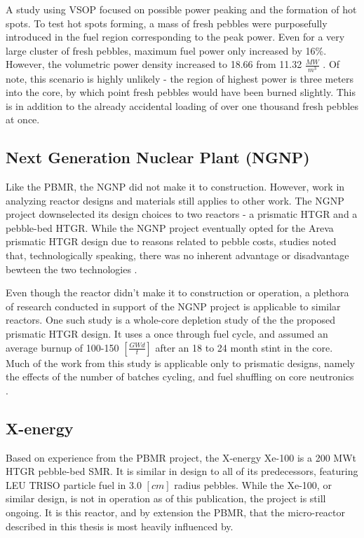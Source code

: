 A study using VSOP focused on possible power peaking and the formation of hot spots.  To test hot spots forming, a mass of fresh pebbles were purposefully introduced in the fuel region corresponding to the peak power.  Even for a very large cluster of fresh pebbles, maximum fuel power only increased by 16\%.  However, the volumetric power density increased to 18.66 from 11.32 $\frac{MW}{m^3}$ \cite{reitsma_investigation_2005}.  Of note, this scenario is highly unlikely - the region of highest power is three meters into the core, by which point fresh pebbles would have been burned slightly.  This is in addition to the already accidental loading of over one thousand fresh pebbles at once.

\subsection{Next Generation Nuclear Plant (NGNP)}

Like the PBMR, the NGNP did not make it to construction.  However, work in analyzing reactor designs and materials still applies to other work.  The NGNP project downselected its design choices to two reactors - a prismatic HTGR and a pebble-bed HTGR.  While the NGNP project eventually opted for the Areva prismatic HTGR design \cite{noauthor_areva_nodate} due to reasons related to pebble costs, studies noted that, technologically speaking, there was no inherent advantage or disadvantage bewteen the two technologies \cite{inl_basis_2011}.

Even though the reactor didn't make it to construction or operation, a plethora of research conducted in support of the NGNP project is applicable to similar reactors.  One such study is a whole-core depletion study of the the proposed prismatic HTGR design.  It uses a once through fuel cycle, and assumed an average burnup of 100-150 $\left[\frac{GWd}{t}\right]$ after an 18 to 24 month stint in the core.  Much of the work from this study is applicable only to prismatic designs, namely the effects of the number of batches cycling, and fuel shuffling on core neutronics \cite{tkkim_whole-core_nodate}.

\subsection{X-energy}

Based on experience from the PBMR project, the X-energy Xe-100 is a 200 MWt HTGR pebble-bed SMR.  It is similar in design to all of its predecessors, featuring LEU TRISO particle fuel in 3.0 $\left[cm\right]$ radius pebbles.  While the Xe-100, or similar design, is not in operation as of this publication, the project is still ongoing.  It is this reactor, and by extension the PBMR, that the micro-reactor described in this thesis is most heavily influenced by.

